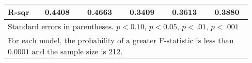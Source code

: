 {\begin{tabular}{l*{5}{c}}
    R-sqr                    & 0.4408                      & 0.4663                      & 0.3409                      & 0.3613                      & 0.3880                      \\
    \bottomrule
    \multicolumn{6}{l}{\footnotesize Standard errors in parentheses. \sym{+} \(p<0.10\), \sym{++} \(p<0.05\), \sym{*} \(p<.01\), \sym{**} \(p<.001\)}                              \\
    \multicolumn{6}{l}{\footnotesize
        For each model, the probability of a greater F-statistic is less than $0.0001$ and the sample size is 212.
    }                                                                                                                                                                              \\
\end{tabular}
}
